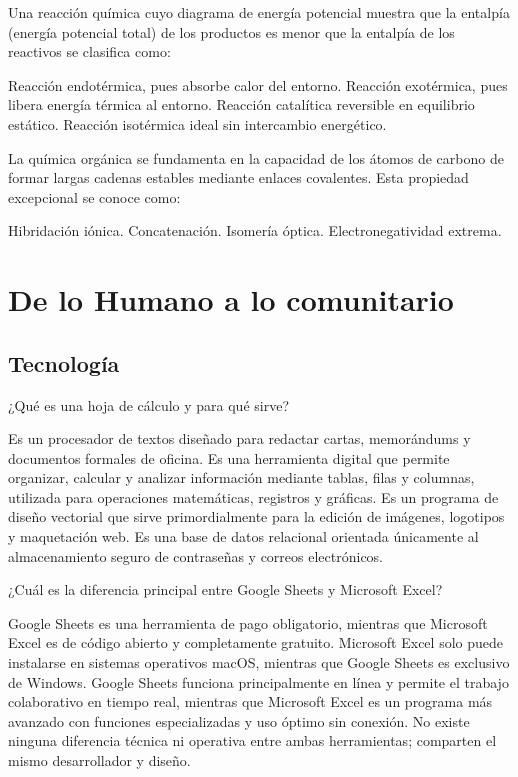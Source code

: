 \documentclass[12pt]{evaluasep}
\begin{document}
\begin{questions}
    \question Una reacción química cuyo diagrama de energía potencial muestra que la entalpía (energía potencial total) de los productos es menor que la entalpía de los reactivos se clasifica como:
    \begin{choices}
        \choice Reacción endotérmica, pues absorbe calor del entorno.
        \CorrectChoice Reacción exotérmica, pues libera energía térmica al entorno.
        \choice Reacción catalítica reversible en equilibrio estático.
        \choice Reacción isotérmica ideal sin intercambio energético.
    \end{choices}

    \question La química orgánica se fundamenta en la capacidad de los átomos de carbono de formar largas cadenas estables mediante enlaces covalentes. Esta propiedad excepcional se conoce como:
    \begin{choices}
        \choice Hibridación iónica.
        \CorrectChoice Concatenación.
        \choice Isomería óptica.
        \choice Electronegatividad extrema.
    \end{choices}

\section{De lo Humano a lo comunitario}
\subsection{Tecnología}
 	\question ¿Qué es una hoja de cálculo y para qué sirve?
    
    \begin{choices}
        \choice Es un procesador de textos diseñado para redactar cartas, memorándums y documentos formales de oficina.
        \CorrectChoice Es una herramienta digital que permite organizar, calcular y analizar información mediante tablas, filas y columnas, utilizada para operaciones matemáticas, registros y gráficas.
        \choice Es un programa de diseño vectorial que sirve primordialmente para la edición de imágenes, logotipos y maquetación web.
        \choice Es una base de datos relacional orientada únicamente al almacenamiento seguro de contraseñas y correos electrónicos.
    
    \end{choices}
    

    \question ¿Cuál es la diferencia principal entre Google Sheets y Microsoft Excel?
    
    \begin{choices}
        \choice Google Sheets es una herramienta de pago obligatorio, mientras que Microsoft Excel es de código abierto y completamente gratuito.
        \choice Microsoft Excel solo puede instalarse en sistemas operativos macOS, mientras que Google Sheets es exclusivo de Windows.
        \CorrectChoice Google Sheets funciona principalmente en línea y permite el trabajo colaborativo en tiempo real, mientras que Microsoft Excel es un programa más avanzado con funciones especializadas y uso óptimo sin conexión.
        \choice No existe ninguna diferencia técnica ni operativa entre ambas herramientas; comparten el mismo desarrollador y diseño.
    

\end{choices}
\end{questions}
\end{document}
